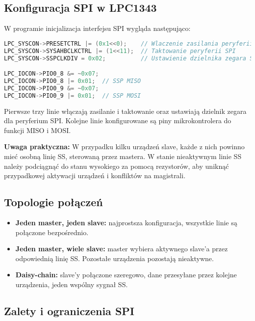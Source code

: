 \documentclass[letterpaper,11pt]{report}
\begin{document}
\subsection{Konfiguracja SPI w LPC1343}

W programie inicjalizacja interfejsu SPI wygląda następująco:
\begin{lstlisting}[language=C]
LPC_SYSCON->PRESETCTRL |= (0x1<<0);    // Wlaczenie zasilania peryferii SPI
LPC_SYSCON->SYSAHBCLKCTRL |= (1<<11);  // Taktowanie peryferii SPI
LPC_SYSCON->SSPCLKDIV = 0x02;          // Ustawienie dzielnika zegara SPI

LPC_IOCON->PIO0_8 &= ~0x07;
LPC_IOCON->PIO0_8 |= 0x01;  // SSP MISO
LPC_IOCON->PIO0_9 &= ~0x07;
LPC_IOCON->PIO0_9 |= 0x01;  // SSP MOSI
\end{lstlisting}
Pierwsze trzy linie włączają zasilanie i taktowanie oraz ustawiają dzielnik zegara dla peryferium SPI. Kolejne linie konfigurowane są piny mikrokontrolera do funkcji MISO i MOSI.

\textbf{Uwaga praktyczna:} W przypadku kilku urządzeń slave, każde z nich powinno mieć osobną linię SS, sterowaną przez mastera. W stanie nieaktywnym linie SS należy podciągnąć do stanu wysokiego za pomocą rezystorów, aby uniknąć przypadkowej aktywacji urządzeń i konfliktów na magistrali.

\subsection{Topologie połączeń}

\begin{itemize}
    \item \textbf{Jeden master, jeden slave:} najprostsza konfiguracja, wszystkie linie są połączone bezpośrednio.
    \item \textbf{Jeden master, wiele slave:} master wybiera aktywnego slave'a przez odpowiednią linię SS. Pozostałe urządzenia pozostają nieaktywne.
    \item \textbf{Daisy-chain:} slave'y połączone szeregowo, dane przesyłane przez kolejne urządzenia, jeden wspólny sygnał SS.
\end{itemize}

\subsection{Zalety i ograniczenia SPI}
\end{document}
